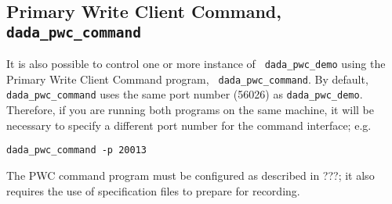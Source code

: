 \subsection{Primary Write Client Command, {\tt dada\_pwc\_command}}

It is also possible to control one or more instance of {\tt
dada\_pwc\_demo} using the Primary Write Client Command program, {\tt
dada\_pwc\_command}.  By default, {\tt dada\_pwc\_command} uses the
same port number (56026) as {\tt dada\_pwc\_demo}.  Therefore, if you
are running both programs on the same machine, it will be necessary to
specify a different port number for the command interface; e.g.
\begin{verbatim}
dada_pwc_command -p 20013
\end{verbatim}

The PWC command program must be configured as described in ???;
it also requires the use of specification files to prepare for recording.
